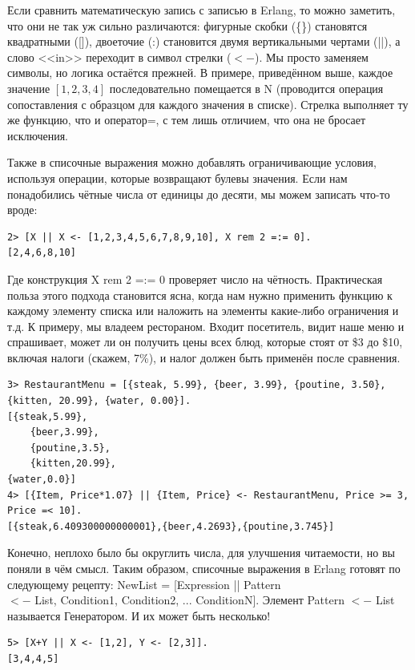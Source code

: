 \documentclass[a4paper,12pt]{report}
\newcommand{\ops}{\colorbox{lgreen}}
\begin{document}
Если сравнить математическую запись с записью в Erlang, то можно заметить, что они не так уж сильно различаются: фигурные скобки (\{\}) становятся квадратными ([]), двоеточие (:) становится двумя вертикальными чертами (||), а слово <<in>> переходит в символ стрелки ($<-$). Мы просто заменяем символы, но логика остаётся прежней. В примере, приведённом выше, каждое значение $[1, 2, 3, 4]$ последовательно помещается в N (проводится операция сопоставления с образцом для каждого значения в списке). Стрелка выполняет ту же функцию, что и оператор\ops{=}, с тем лишь отличием, что она не бросает исключения.

Также в списочные выражения можно добавлять ограничивающие условия, используя операции, которые возвращают булевы значения. Если нам понадобились чётные числа от единицы до десяти, мы можем записать что\--то вроде:
\begin{lstlisting}[style=repl]
2> [X || X <- [1,2,3,4,5,6,7,8,9,10], X rem 2 =:= 0].
[2,4,6,8,10]
\end{lstlisting}

Где конструкция \ops{X rem 2 =:= 0} проверяет число на чётность. Практическая польза этого подхода становится ясна, когда нам нужно применить функцию к каждому элементу списка или наложить на элементы какие\--либо ограничения и т.д. К примеру, мы владеем рестораном. Входит посетитель, видит наше меню и спрашивает, может ли он получить цены всех блюд, которые стоят от \$3 до \$10, включая налоги (скажем, 7\%), и налог должен быть применён после сравнения.
\begin{lstlisting}[style=repl]
3> RestaurantMenu = [{steak, 5.99}, {beer, 3.99}, {poutine, 3.50}, {kitten, 20.99}, {water, 0.00}].
[{steak,5.99},
    {beer,3.99},
    {poutine,3.5},
    {kitten,20.99},
{water,0.0}]
4> [{Item, Price*1.07} || {Item, Price} <- RestaurantMenu, Price >= 3, Price =< 10].
[{steak,6.409300000000001},{beer,4.2693},{poutine,3.745}]
\end{lstlisting}

Конечно, неплохо было бы округлить числа, для улучшения читаемости, но вы поняли в чём смысл. Таким образом, списочные выражения в Erlang готовят по следующему рецепту: \ops{NewList = [Expression || Pattern}\\ 
\ops{ $<-$ List, Condition1, Condition2, ... ConditionN]}. Элемент \ops{Pattern $<-$ List} называется Генератором. И их может быть несколько!\\ 
\begin{lstlisting}[style=repl]
5> [X+Y || X <- [1,2], Y <- [2,3]].
[3,4,4,5]
\end{lstlisting}
\end{document}
